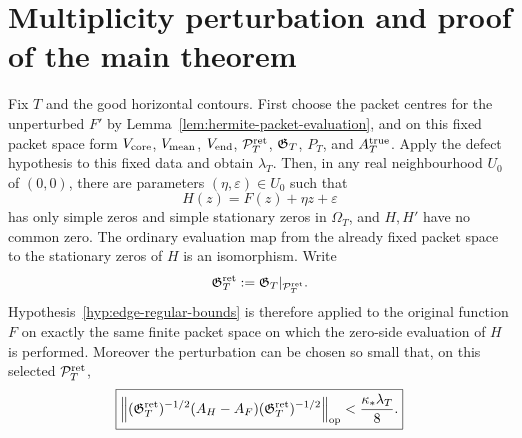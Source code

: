 \section{Multiplicity perturbation and proof of the main theorem}
\label{sec:multiplicity-endgame}

\begin{lemma}
\label{lem:generic-affine}
Fix $T$ and the good horizontal contours.  First choose the packet centres for
the unperturbed $F'$ by Lemma~\ref{lem:hermite-packet-evaluation}, and on this
fixed packet space form $V_{\rm core}$, $V_{\rm mean}$, $V_{\rm end}$,
$\mathcal P_T^{\rm ret}$, $\mathfrak G_T$, $P_T$, and $A_T^{\rm true}$.  Apply the defect hypothesis
to this fixed data and obtain $\lambda_T$.  Then, in any real neighbourhood
$U_0$ of $(0,0)$, there are parameters $(\eta,\varepsilon)\in U_0$ such that
\[
H(z)=F(z)+\eta z+\varepsilon
\]
has only simple zeros and simple stationary zeros in $\Omega_T$, and $H,H'$ have
no common zero.  The ordinary evaluation map from the already fixed packet
space to the stationary zeros of $H$ is an isomorphism.  Write
\[
\mathfrak G_T^{\rm ret}:=\mathfrak G_T|_{\mathcal P_T^{\rm ret}}.
\]
Hypothesis~\ref{hyp:edge-regular-bounds} is therefore applied to the
original function $F$ on exactly the same finite packet space on which the
zero-side evaluation of $H$ is performed. Moreover the perturbation can be
chosen so small that, on this selected $\mathcal P_T^{\rm ret}$,
\begin{equation}
\boxed{
\left\|
(\mathfrak G_T^{\rm ret})^{-1/2}(A_H-A_F)
(\mathfrak G_T^{\rm ret})^{-1/2}
\right\|_{\operatorname{op}}<\frac{\kappa_*\lambda_T}{8}.
}
\label{eq:perturb-small}
\end{equation}
\end{lemma}

